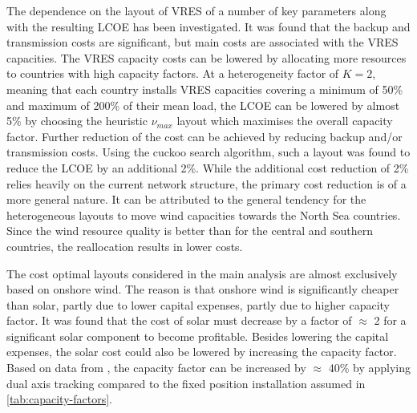 \documentclass[a4paper, 5p, sort&compress]{elsarticle}%
\begin{document}
The dependence on the layout of VRES of a number of key parameters
along with the resulting LCOE has been investigated. It was found that
the backup and transmission costs are significant, but main costs are
associated with the VRES capacities. The VRES capacity costs can be
lowered by allocating more resources to countries with high capacity
factors. At a heterogeneity factor of $K = 2$, meaning that each
country installs VRES capacities covering a minimum of 50\% and
maximum of 200\% of their mean load, the LCOE can be lowered by almost
5\% by choosing the heuristic $\nu_{max}$ layout which maximises the
overall capacity factor. Further reduction of the cost can be achieved
by reducing backup and/or transmission costs. Using the cuckoo search
algorithm, such a layout was found to reduce the LCOE by an additional
2\%. While the additional cost reduction of 2\% relies heavily on the
current network structure, the primary cost reduction is of a more
general nature. It can be attributed to the general tendency for the
heterogeneous layouts to move wind capacities towards the North Sea
countries. Since the wind resource quality is better than for the
central and southern countries, the reallocation results in lower
costs.



The cost optimal layouts considered in the main analysis are almost
exclusively based on onshore wind. The reason is that onshore wind is
significantly cheaper than solar, partly due to lower capital
expenses, partly due to higher capacity factor. It was found that the
cost of solar must decrease by a factor of $\approx$ 2 for a
significant solar component to become profitable. Besides lowering the
capital expenses, the solar cost could also be lowered by increasing
the capacity factor. Based on data from \cite{REA}, the capacity factor can
be increased by $\approx$ 40\% by applying dual axis tracking compared
to the fixed position installation assumed in
\cref{tab:capacity-factors}. %
\end{document}
